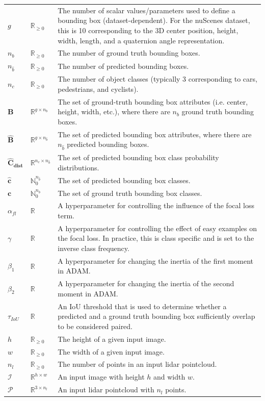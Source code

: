 \documentclass[12pt]{article}
\begin{document}
\begin{longtable*}{l l p{12cm}}
\\
$g$ & $\mathbb{R}_{\geq0}$ & The number of scalar values/parameters used to define a bounding box (dataset-dependent). For the nuScenes dataset, this is 10 corresponding to the 3D center position, height, width, length, and a quaternion angle representation. 
\\
$n_{b}$ & $\mathbb{R}_{\geq0}$ & The number of ground truth bounding boxes. 
\\
$n_{\hat{b}}$ & $\mathbb{R}_{\geq0}$ & The number of predicted bounding boxes. 
\\
$n_{c}$ & $\mathbb{R}_{\geq0}$ & The number of object classes (typically 3 corresponding to cars, pedestrians, and cyclists). 
\\
$\mathbf{B}$ & $\mathbb{R}^{g\times{}n_b}$ & The set of ground-truth bounding box attributes (i.e. center, height, width, etc.), where there are $n_b$ ground truth bounding boxes.
\\
$\mathbf{\hat{B}}$ & $\mathbb{R}^{g\times{}n_{\hat{b}}}$ & The set of predicted bounding box attributes, where there are $n_{\hat{b}}$ predicted bounding boxes.
\\
$\mathbf{\hat{C}_{\text{dist}}}$ & $\mathbb{R}^{n_c\times{}n_{\hat{b}}}$ & The set of predicted bounding box class probability distributions.
\\
$\mathbf{\hat{c}}$ & $\mathbb{N}_{0}^{n_{\hat{b}}}$ & The set of predicted bounding box classes.
\\
$\mathbf{c}$ & $\mathbb{N}_{0}^{n_b}$ & The set of ground truth bounding box classes.
\\
$\alpha_{fl}$ & $\mathbb{R}$ & A hyperparameter for controlling the influence of the focal loss term.
\\
$\gamma$ & $\mathbb{R}$ & A hyperparameter for controlling the effect of easy examples on the focal loss. In practice, this is class specific and is set to the inverse class frequency.
\\
$\beta_1$ & $\mathbb{R}$ & A hyperparameter for changing the inertia of the first moment in ADAM.
\\
$\beta_2$ & $\mathbb{R}$ & A hyperparameter for changing the inertia of the second moment in ADAM.
\\
$\tau_{IoU}$ & $\mathbb{R}$ & An IoU threshold that is used to determine whether a predicted and a ground truth bounding box sufficiently overlap to be considered paired.
\\
$h$ & $\mathbb{R}_{\geq0}$ & The height of a given input image. 
\\
$w$ & $\mathbb{R}_{\geq0}$ & The width of a given input image. 
\\
$n_{l}$ & $\mathbb{R}_{\geq0}$ & The number of points in an input lidar pointcloud. 
\\
$\mathcal{I}$ & $\mathbb{R}^{h\times{}w}$ & An input image with height $h$ and width $w$.
\\
$\mathcal{P}$ & $\mathbb{R}^{3\times{}n_l}$ & An input lidar pointcloud with $n_l$ points.
\\
\bottomrule
\end{longtable*}
\end{document}
